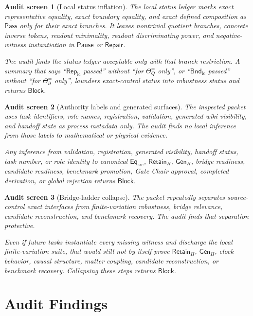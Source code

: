 \documentclass[11pt]{article}
\newcommand{\EqSrc}{\mathsf{Eq}_{\mathrm{src}}}
\newcommand{\RepLC}{\mathsf{Rep}_{\mathrm{lc}}}
\newcommand{\BndLC}{\mathsf{Bnd}_{\mathrm{lc}}}
\newcommand{\RetainH}{\mathsf{Retain}_{H}}
\newcommand{\GenH}{\mathsf{Gen}_{H}}
\newcommand{\Pass}{\mathsf{Pass}}
\newcommand{\Block}{\mathsf{Block}}
\newcommand{\Pause}{\mathsf{Pause}}
\newcommand{\Repair}{\mathsf{Repair}}
\newtheorem{screen}{Audit screen}
\begin{document}
\begin{screen}[Local status inflation]
The local status ledger marks exact representative equality, exact
boundary equality, and exact defined composition as \(\Pass\) only for
their exact branches. It leaves nontrivial quotient branches,
concrete inverse tokens, readout minimality, readout discriminating
power, and negative-witness instantiation in \(\Pause\) or
\(\Repair\).

The audit finds the status ledger acceptable only with that branch
restriction. A summary that says ``\(\RepLC\) passed'' without
``for \(\Theta_Q^{=}\) only'', or ``\(\BndLC\) passed'' without
``for \(\Theta_{\partial}^{=}\) only'', launders exact-control status
into robustness status and returns \(\Block\).
\end{screen}

\begin{screen}[Authority labels and generated surfaces]
The inspected packet uses task identifiers, role names, registration,
validation, generated wiki visibility, and handoff state as process
metadata only. The audit finds no local inference from those labels to
mathematical or physical evidence.

Any inference from validation, registration, generated visibility,
handoff status, task number, or role identity to canonical \(\EqSrc\),
\(\RetainH\), \(\GenH\), bridge readiness, candidate readiness,
benchmark promotion, Gate Chair approval, completed derivation, or
global rejection returns \(\Block\).
\end{screen}

\begin{screen}[Bridge-ladder collapse]
The packet repeatedly separates source-control exact interfaces from
finite-variation robustness, bridge relevance, candidate
reconstruction, and benchmark recovery. The audit finds that separation
protective.

Even if future tasks instantiate every missing witness and discharge
the local finite-variation suite, that would still not by itself prove
\(\RetainH\), \(\GenH\), clock behavior, causal structure, matter
coupling, candidate reconstruction, or benchmark recovery. Collapsing
these steps returns \(\Block\).
\end{screen}

\section{Audit Findings}
\end{document}
